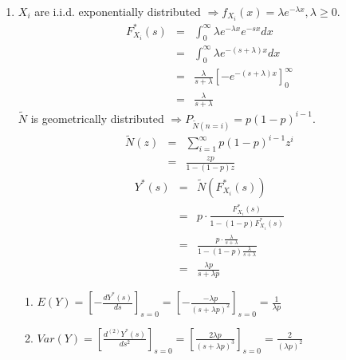 \documentclass[UTF8,nofonts]{ctexart}
\begin{document}
\begin{enumerate}
{\begin{enumerate}
      \end{enumerate}
    }
    \item{
      $X_{i}$ are i.i.d. exponentially distributed $\Rightarrow f_{X_{i}}(x) = \lambda e^{-\lambda x}, \lambda \geq 0$.
      \begin{eqnarray*}
        F_{X_{i}}^{*}(s) &=& \int_{0}^{\infty}\lambda e^{-\lambda x}e^{-sx}dx \\
        &=& \int_{0}^{\infty}\lambda e^{-(s + \lambda) x}dx \\
        &=& \frac{\lambda}{s + \lambda}[-e^{-(s + \lambda)x}]_{0}^{\infty} \\
        &=& \frac{\lambda}{s + \lambda}
      \end{eqnarray*}
      $\tilde{N}$ is geometrically distributed $\Rightarrow P_{\tilde{N}(n = i)} = p(1 - p)^{i - 1}$.
      \begin{eqnarray*}
        \tilde{N}(z) &=& \sum_{i=1}^{\infty}p(1 - p)^{i - 1}z^{i} \\
        &=& \frac{zp}{1 - (1 - p)z}
      \end{eqnarray*}
      \begin{eqnarray*}
        Y^{*}(s) &=& \tilde{N}(F_{X_{i}}^{*}(s)) \\
        &=& p \cdot \frac{F_{X_{i}}^{*}(s)}{1 - (1 - p)F_{X_{i}}^{*}(s)} \\
        &=& \frac{p \cdot \frac{\lambda}{s + \lambda}}{1 - (1 - p)\frac{\lambda}{s + \lambda}} \\
        &=& \frac{\lambda p}{s + \lambda p}
      \end{eqnarray*}
      \begin{enumerate}
        \item{
          $E(Y) = [-\frac{dY^{*}(s)}{ds}]_{s=0} = [-\frac{-\lambda p}{(s + \lambda p)^2}]_{s=0} = \frac{1}{\lambda p}$
        }
        \item{
          $Var(Y) = [\frac{d^{(2)}Y^{*}(s)}{ds^2}]_{s=0} = [\frac{2\lambda p}{(s + \lambda p)^3}]_{s=0} = \frac{2}{(\lambda p)^2}$
        }
      \end{enumerate}
    }
  \end{enumerate}
\end{document}
